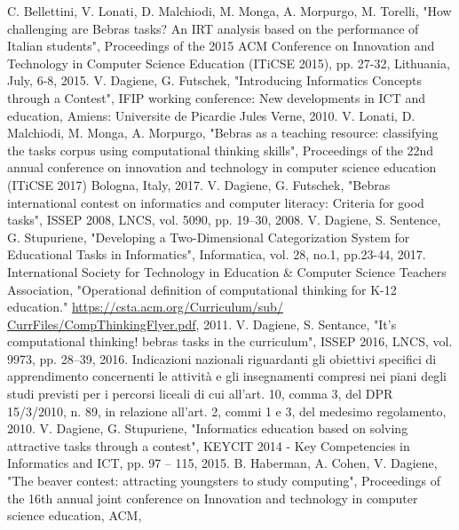 \documentclass[12pt]{report}
\begin{document}
%
%
\begin{thebibliography}{00}
%
C. Bellettini, V. Lonati, D. Malchiodi, M. Monga, A. Morpurgo, M. Torelli, 
"How challenging are Bebras tasks? An IRT analysis based on the performance of Italian students", 
Proceedings of the 2015 ACM Conference on Innovation and Technology in Computer Science Education (ITiCSE 2015), 
pp. 27-32, 
Lithuania, 
July, 6-8, 
2015.
%
V. Dagiene, G. Futschek, 
"Introducing Informatics Concepts through a Contest", 
IFIP working conference: New developments in ICT and education, 
Amiens: Universite de Picardie Jules Verne, 
2010.
%
V. Lonati, D. Malchiodi, M. Monga, A. Morpurgo, 
"Bebras as a teaching resource: classifying the tasks corpus using computational thinking skills", 
Proceedings of the 22nd annual conference on innovation and technology in computer science education (ITiCSE 2017) 
Bologna, Italy, 
2017.
%
V. Dagiene, G. Futschek, 
"Bebras international contest on informatics and computer literacy: Criteria for good tasks", 
ISSEP 2008, 
LNCS, vol. 5090, 
pp. 19–30, 
2008.
%
V. Dagiene, S. Sentence, G. Stupuriene, 
"Developing a Two-Dimensional Categorization System for Educational Tasks in Informatics", 
Informatica, vol. 28, no.1, 
pp.23-44, 
2017.
%
International Society for Technology in Education \& Computer Science Teachers Association, 
"Operational definition of computational thinking for K-12 education."
\url{https://csta.acm.org/Curriculum/sub/ CurrFiles/CompThinkingFlyer.pdf}, 
2011.
%
V. Dagiene, S. Sentance, 
"It’s computational thinking! bebras tasks in the curriculum", 
ISSEP 2016, 
LNCS, vol. 9973, 
pp. 28–39, 
2016.
%
Indicazioni nazionali riguardanti gli obiettivi specifici di apprendimento concernenti le attività e gli insegnamenti compresi nei piani degli studi previsti per i percorsi liceali di cui all'art. 10, comma 3, del DPR 15/3/2010, n. 89, in relazione all'art. 2, commi 1 e 3, del medesimo regolamento, 2010.
%
V. Dagiene, G. Stupuriene, 
"Informatics education based on solving attractive tasks through a contest", 
KEYCIT 2014 - Key Competencies in Informatics and ICT, 
pp. 97 – 115, 
2015.
%
B. Haberman, A. Cohen, V. Dagiene, 
"The beaver contest: attracting youngsters to study computing", 
Proceedings of the 16th annual joint conference on Innovation and technology in computer science education, ACM, 

\end{thebibliography}
\end{document}
